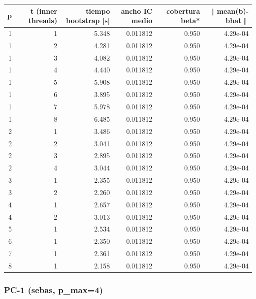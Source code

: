 \documentclass[11pt]{article}
\begin{document}
\begin{center}
\begin{tabular}{rrrrrr}
\toprule
p & t (inner threads) & tiempo bootstrap [s] & ancho IC medio & cobertura beta* & $\|$mean(b)-bhat$\|$ \\
\midrule
1 & 1 & 5.348 & 0.011812 & 0.950 & 4.29e-04 \\
1 & 2 & 4.281 & 0.011812 & 0.950 & 4.29e-04 \\
1 & 3 & 4.082 & 0.011812 & 0.950 & 4.29e-04 \\
1 & 4 & 4.440 & 0.011812 & 0.950 & 4.29e-04 \\
1 & 5 & 5.908 & 0.011812 & 0.950 & 4.29e-04 \\
1 & 6 & 3.895 & 0.011812 & 0.950 & 4.29e-04 \\
1 & 7 & 5.978 & 0.011812 & 0.950 & 4.29e-04 \\
1 & 8 & 6.485 & 0.011812 & 0.950 & 4.29e-04 \\
2 & 1 & 3.486 & 0.011812 & 0.950 & 4.29e-04 \\
2 & 2 & 3.041 & 0.011812 & 0.950 & 4.29e-04 \\
2 & 3 & 2.895 & 0.011812 & 0.950 & 4.29e-04 \\
2 & 4 & 3.044 & 0.011812 & 0.950 & 4.29e-04 \\
3 & 1 & 2.355 & 0.011812 & 0.950 & 4.29e-04 \\
3 & 2 & 2.260 & 0.011812 & 0.950 & 4.29e-04 \\
4 & 1 & 2.657 & 0.011812 & 0.950 & 4.29e-04 \\
4 & 2 & 3.013 & 0.011812 & 0.950 & 4.29e-04 \\
5 & 1 & 2.534 & 0.011812 & 0.950 & 4.29e-04 \\
6 & 1 & 2.350 & 0.011812 & 0.950 & 4.29e-04 \\
7 & 1 & 2.361 & 0.011812 & 0.950 & 4.29e-04 \\
8 & 1 & 2.158 & 0.011812 & 0.950 & 4.29e-04 \\
\bottomrule
\end{tabular}
\end{center}

\subsubsection*{PC-1 (sebas, p\_max=4)}
\end{document}
